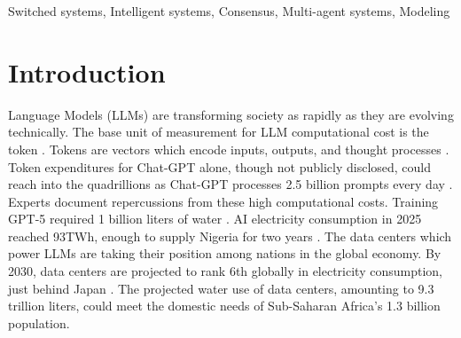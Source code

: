 \documentclass[journal,twoside,web]{ieeecolor_no_firstpage_logo}
\begin{document}
\begin{IEEEkeywords}
Switched systems, Intelligent systems, Consensus, Multi-agent systems, Modeling
\end{IEEEkeywords}

\section{Introduction}
\label{sec:introduction}
 Language Models (LLMs) are transforming society as rapidly as they are evolving technically. %
The base unit of measurement for LLM computational cost is the token \cite{bib4}. Tokens are vectors which encode inputs, outputs, and thought processes \cite{bib5}. %
Token expenditures for Chat-GPT alone, though not publicly disclosed, could reach into the quadrillions as Chat-GPT processes 2.5 billion prompts every day \cite{bib6}. Experts document repercussions from these high computational costs. Training GPT-5 required 1 billion liters of water \cite{bib6}. AI electricity consumption in 2025 reached 93TWh, enough to supply Nigeria for two years \cite{bib6}. The data centers which power LLMs are taking their position among nations in the global economy. By 2030, data centers are projected to rank 6th globally in electricity consumption, just behind Japan \cite{bib6}. The projected water use of data centers, amounting to 9.3 trillion liters, could meet the domestic needs of Sub-Saharan Africa's 1.3 billion population. 
\end{document}
